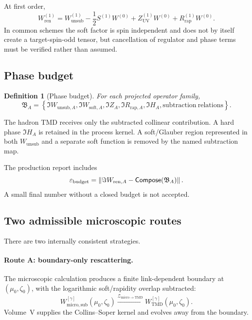 \documentclass[11pt]{article}
\newtheorem{definition}{Definition}[section]
\newcommand{\TMD}{\mathrm{TMD}}
\newcommand{\cZ}{\mathcal Z}
\newcommand{\eps}{\varepsilon}
\newcommand{\norm}[1]{\left\lVert#1\right\rVert}
\newcommand{\unsub}{\mathrm{unsub}}
\newcommand{\subtr}{\mathrm{sub}}
\newcommand{\ren}{\mathrm{ren}}
\newcommand{\soft}{\mathrm{soft}}
\newcommand{\micro}{\mathrm{micro}}
\newcommand{\rap}{\mathrm{rap}}
\newcommand{\UV}{\mathrm{UV}}
\begin{document}
At first order,
\begin{equation}
 W_{\ren}^{(1)}
 =W_{\unsub}^{(1)}
 -\frac12 S^{(1)}W^{(0)}
 +Z_{\UV}^{(1)}W^{(0)}
 +R_{\rap}^{(1)}W^{(0)}.
\label{eq:first-order-subtraction}
\end{equation}
In common schemes the soft factor is spin independent and does not by itself
create a target-spin-odd tensor, but cancellation of regulator and phase
terms must be verified rather than assumed.

\subsection{Phase budget}

\begin{definition}[Phase budget]
\label{def:phase-budget}
For each projected operator family,
\begin{equation}
 \mathfrak B_A
 =\left\{
 \Im W_{\unsub,A},
 \Im W_{\soft,A},
 \Im Z_A,
 \Im R_{\rap,A},
 \Im H_A,
 \mathrm{subtraction\ relations}
 \right\}.
\label{eq:phase-budget}
\end{equation}
\end{definition}
The hadron TMD receives only the subtracted collinear contribution.  A hard
phase \(\Im H_A\) is retained in the process kernel.  A soft/Glauber region
represented in both \(W_{\unsub}\) and a separate soft function is removed by
the named subtraction map.

The production report includes
\begin{equation}
 \eps_{\rm budget}
 =\norm{
 \Im W_{\ren,A}
 -\mathsf{Compose}(\mathfrak B_A)
 }.
\label{eq:phase-budget-residual}
\end{equation}
A small final number without a closed budget is not accepted.

\subsection{Two admissible microscopic routes}

There are two internally consistent strategies.

\paragraph{Route A: boundary-only rescattering.}
The microscopic calculation produces a finite link-dependent boundary at
\((\mu_0,\zeta_0)\), with the logarithmic soft/rapidity overlap subtracted:
\begin{equation}
 W_{\micro,\subtr}^{[\gamma]}(\mu_0,\zeta_0)
 \xrightarrow{\cZ_{\micro\to\TMD}}
 W_{\TMD}^{[\gamma]}(\mu_0,\zeta_0).
\label{eq:boundary-only-route}
\end{equation}
Volume~V supplies the Collins--Soper kernel and evolves away from the boundary.
\end{document}
